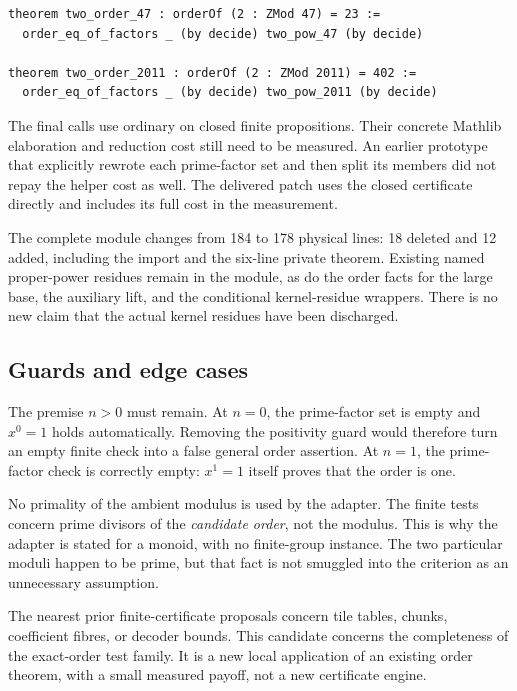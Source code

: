 \documentclass[11pt]{article}
\newcommand{\name}[1]{\texttt{\detokenize{#1}}}
\begin{document}
\begin{lstlisting}
theorem two_order_47 : orderOf (2 : ZMod 47) = 23 :=
  order_eq_of_factors _ (by decide) two_pow_47 (by decide)

theorem two_order_2011 : orderOf (2 : ZMod 2011) = 402 :=
  order_eq_of_factors _ (by decide) two_pow_2011 (by decide)
\end{lstlisting}

The final calls use ordinary \name{decide} on closed finite propositions.
Their concrete Mathlib elaboration and reduction cost still need to be
measured. An earlier
prototype that explicitly rewrote each prime-factor set and then split its
members did not repay the helper cost as well. The delivered patch uses the
closed certificate directly and includes its full cost in the measurement.

The complete module changes from 184 to 178 physical lines: 18 deleted and
12 added, including the import and the six-line private theorem. Existing
named proper-power residues remain in the module, as do the order facts for
the large base, the auxiliary lift, and the conditional kernel-residue wrappers.
There is no new claim that the actual kernel residues have been discharged.

\subsection{Guards and edge cases}

The premise \(n>0\) must remain. At \(n=0\), the prime-factor set is empty and
\(x^0=1\) holds automatically. Removing the positivity guard would therefore
turn an empty finite check into a false general order assertion. At \(n=1\),
the prime-factor check is correctly empty: \(x^1=1\) itself proves that the
order is one.

No primality of the ambient modulus is used by the adapter. The finite tests
concern prime divisors of the \emph{candidate order}, not the modulus. This is
why the adapter is stated for a monoid, with no finite-group instance. The two
particular moduli happen to be prime, but that fact is not smuggled into the
criterion as an unnecessary assumption.

The nearest prior finite-certificate proposals concern tile tables, chunks,
coefficient fibres, or decoder bounds. This candidate concerns the completeness
of the exact-order test family. It is a new local application of an existing
order theorem, with a small measured payoff, not a new certificate engine.
\end{document}
